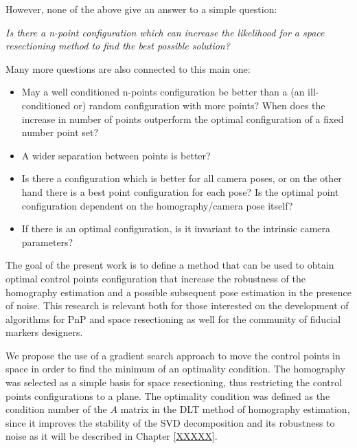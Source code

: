 \documentclass[letterpaper, 10 pt, conference]{ieeeconf}  %
\begin{document}
	However, none of the above give an answer to a simple question: 
	
	\textit{Is there a n-point configuration which can increase the likelihood for a space resectioning method to find the best possible solution?}
	
	Many more questions are also connected to this main one:
	
	\begin{itemize}
		\item May a well conditioned n-points configuration be better than a (an ill-conditioned or) random configuration with more points? When does the increase in number of points outperform the optimal configuration of a fixed number point set? 
		\item A wider separation between points is better?
		\item Is there a configuration which is better for all camera poses, or on the other hand there is a best point configuration for each pose? Is the optimal point configuration dependent on the homography/camera pose itself?
		\item If there is an optimal configuration, is it invariant to the intrinsic camera parameters?
	\end{itemize}
	
	The goal of the present work is to define a method that can be used to obtain optimal control points configuration that increase the robustness of the homography estimation and a possible subsequent pose estimation in the presence of noise. This research is relevant both for those interested on the development of algorithms for PnP and space resectioning as well for the community of fiducial markers designers.
	
	We propose the use of a gradient search approach to move the control points in space in order to find the minimum of an optimality condition. The homography was selected as a simple basis for space resectioning, thus restricting the control points configurations to a plane. The optimality condition was defined as the condition number of the $A$ matrix in the DLT method of homography estimation, since it improves the stability of the SVD decomposition and its robustness to noise as it will be described in Chapter \ref{XXXXX}.
	
	
	
	
	
\end{document}
